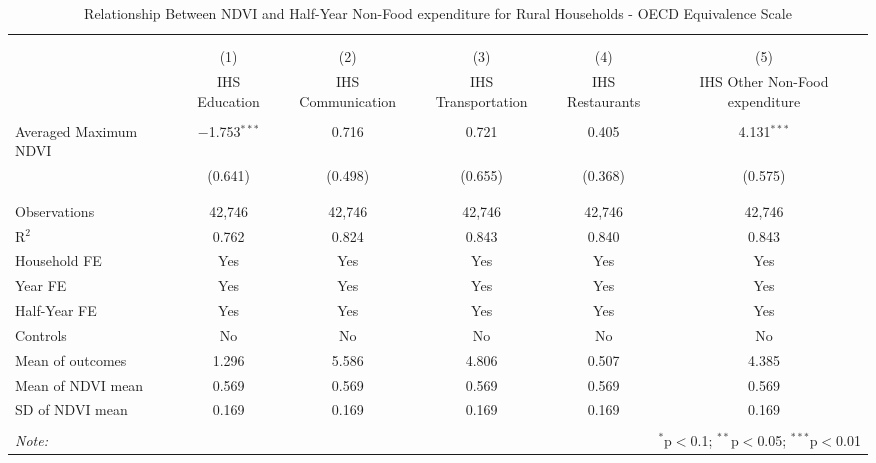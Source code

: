 
\begin{table}[!htbp] \centering 
  \caption{Relationship Between NDVI and Half-Year Non-Food expenditure for Rural Households - OECD Equivalence Scale} 
  \label{ndvi_table_4_2_rural.tex} 
\normalsize 
\begin{tabular}{@{\extracolsep{5pt}}lccccc} 
\\[-1.8ex]\hline 
\hline \\[-1.8ex] 
\\[-1.8ex] & (1) & (2) & (3) & (4) & (5)\\ 
 & IHS Education & IHS Communication & IHS Transportation & IHS Restaurants & IHS Other Non-Food expenditure \\ 
\hline \\[-1.8ex] 
 Averaged Maximum NDVI & $-$1.753$^{***}$ & 0.716 & 0.721 & 0.405 & 4.131$^{***}$ \\ 
  & (0.641) & (0.498) & (0.655) & (0.368) & (0.575) \\ 
  & & & & & \\ 
\hline \\[-1.8ex] 
Observations & 42,746 & 42,746 & 42,746 & 42,746 & 42,746 \\ 
R$^{2}$ & 0.762 & 0.824 & 0.843 & 0.840 & 0.843 \\ 
Household FE & Yes & Yes & Yes & Yes & Yes \\ 
Year FE & Yes & Yes & Yes & Yes & Yes \\ 
Half-Year FE & Yes & Yes & Yes & Yes & Yes \\ 
Controls & No & No & No & No & No \\ 
Mean of outcomes & 1.296 & 5.586 & 4.806 & 0.507 & 4.385 \\ 
Mean of NDVI mean & 0.569 & 0.569 & 0.569 & 0.569 & 0.569 \\ 
SD of NDVI mean & 0.169 & 0.169 & 0.169 & 0.169 & 0.169 \\ 
\hline \\[-1.8ex] 
\textit{Note:}  & \multicolumn{5}{r}{$^{*}$p$<$0.1; $^{**}$p$<$0.05; $^{***}$p$<$0.01} \\ 
\end{tabular} 
\end{table} 
